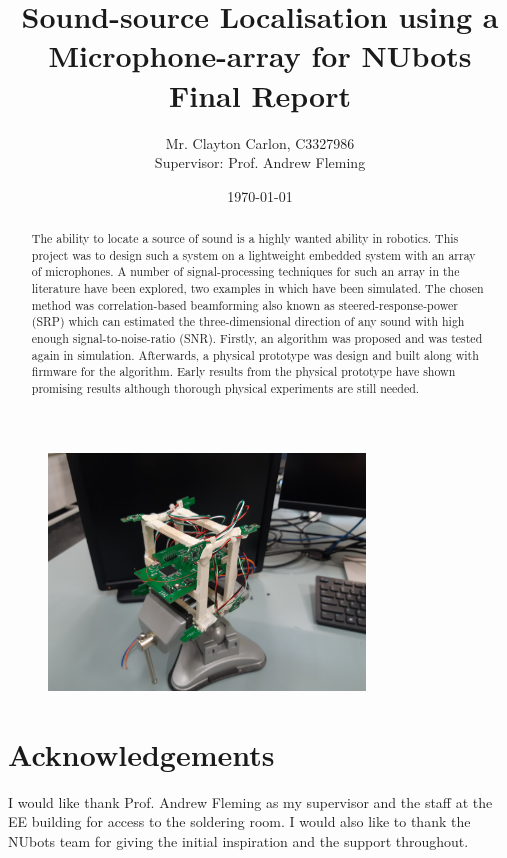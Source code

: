 \documentclass[notitlepage]{report}
\title{
	Sound-source Localisation using a Microphone-array for NUbots\\
	Final Report
}
\author{Mr. Clayton Carlon, C3327986\\Supervisor: Prof. Andrew Fleming}
\date{\today}
\begin{document}
\maketitle

\begin{figure}[H]
\includegraphics[width=0.75\textwidth]{./photo_array.jpg}
\centering
\end{figure}

\begin{abstract}
The ability to locate a source of sound is a highly wanted ability in robotics. This project was to design such a system on a lightweight embedded system with an array of microphones. A number of signal-processing techniques for such an array in the literature have been explored, two examples in which have been simulated. The chosen method was correlation-based beamforming also known as steered-response-power (SRP) which can estimated the three-dimensional direction of any sound with high enough signal-to-noise-ratio (SNR). Firstly, an algorithm was proposed and was tested again in simulation. Afterwards, a physical prototype was design and built along with firmware for the algorithm. Early results from the physical prototype have shown promising results although thorough physical experiments are still needed.
\end{abstract}

\section*{Acknowledgements}

I would like thank Prof. Andrew Fleming as my supervisor and the staff at the EE building for access to the soldering room. I would also like to thank the NUbots team for giving the initial inspiration and the support throughout.
\end{document}
